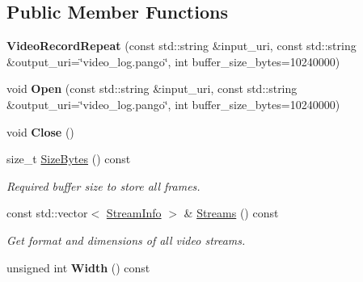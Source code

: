 \subsection*{Public Member Functions}
\begin{DoxyCompactItemize}
\item 
{\bfseries Video\+Record\+Repeat} (const std\+::string \&input\+\_\+uri, const std\+::string \&output\+\_\+uri=\char`\"{}video\+\_\+log.\+pango\char`\"{}, int buffer\+\_\+size\+\_\+bytes=10240000)\hypertarget{structpangolin_1_1_video_record_repeat_a22391fffc56b1dfaeae3866f22326636}{}\label{structpangolin_1_1_video_record_repeat_a22391fffc56b1dfaeae3866f22326636}

\item 
void {\bfseries Open} (const std\+::string \&input\+\_\+uri, const std\+::string \&output\+\_\+uri=\char`\"{}video\+\_\+log.\+pango\char`\"{}, int buffer\+\_\+size\+\_\+bytes=10240000)\hypertarget{structpangolin_1_1_video_record_repeat_a19197695b92c2d521704c6896497d940}{}\label{structpangolin_1_1_video_record_repeat_a19197695b92c2d521704c6896497d940}

\item 
void {\bfseries Close} ()\hypertarget{structpangolin_1_1_video_record_repeat_abf31dc22fd1db65af63ac67a10c21b74}{}\label{structpangolin_1_1_video_record_repeat_abf31dc22fd1db65af63ac67a10c21b74}

\item 
size\+\_\+t \hyperlink{structpangolin_1_1_video_record_repeat_a4435bf9e21453d7930535f40ace62360}{Size\+Bytes} () const \hypertarget{structpangolin_1_1_video_record_repeat_a4435bf9e21453d7930535f40ace62360}{}\label{structpangolin_1_1_video_record_repeat_a4435bf9e21453d7930535f40ace62360}

\begin{DoxyCompactList}\small\item\em Required buffer size to store all frames. \end{DoxyCompactList}\item 
const std\+::vector$<$ \hyperlink{classpangolin_1_1_stream_info}{Stream\+Info} $>$ \& \hyperlink{structpangolin_1_1_video_record_repeat_a20fa16106a2f18c015295ac2bab06216}{Streams} () const \hypertarget{structpangolin_1_1_video_record_repeat_a20fa16106a2f18c015295ac2bab06216}{}\label{structpangolin_1_1_video_record_repeat_a20fa16106a2f18c015295ac2bab06216}

\begin{DoxyCompactList}\small\item\em Get format and dimensions of all video streams. \end{DoxyCompactList}\item 
unsigned int {\bfseries Width} () const \hypertarget{structpangolin_1_1_video_record_repeat_a545c8761da4018c3e1fa3ad5973a60ad}{}\label{structpangolin_1_1_video_record_repeat_a545c8761da4018c3e1fa3ad5973a60ad}


\end{DoxyCompactItemize}
